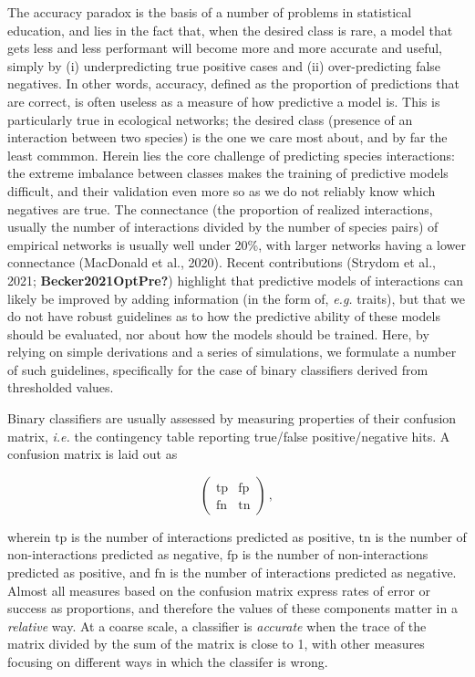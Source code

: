 \documentclass[11pt]{article}
\begin{document}
\vfill

\clearpage
\linenumbers
\pagestyle{normal}

The accuracy paradox is the basis of a number of problems in statistical
education, and lies in the fact that, when the desired class is rare, a
model that gets less and less performant will become more and more
accurate and useful, simply by (i) underpredicting true positive cases
and (ii) over-predicting false negatives. In other words, accuracy,
defined as the proportion of predictions that are correct, is often
useless as a measure of how predictive a model is. This is particularly
true in ecological networks; the desired class (presence of an
interaction between two species) is the one we care most about, and by
far the least commmon. Herein lies the core challenge of predicting
species interactions: the extreme imbalance between classes makes the
training of predictive models difficult, and their validation even more
so as we do not reliably know which negatives are true. The connectance
(the proportion of realized interactions, usually the number of
interactions divided by the number of species pairs) of empirical
networks is usually well under 20\%, with larger networks having a lower
connectance (MacDonald et al., 2020). Recent contributions (Strydom et
al., 2021; \textbf{Becker2021OptPre?}) highlight that predictive models
of interactions can likely be improved by adding information (in the
form of, \emph{e.g.} traits), but that we do not have robust guidelines
as to how the predictive ability of these models should be evaluated,
nor about how the models should be trained. Here, by relying on simple
derivations and a series of simulations, we formulate a number of such
guidelines, specifically for the case of binary classifiers derived from
thresholded values.

Binary classifiers are usually assessed by measuring properties of their
confusion matrix, \emph{i.e.} the contingency table reporting true/false
positive/negative hits. A confusion matrix is laid out as

\[\begin{pmatrix}
    \text{tp} & \text{fp} \\
    \text{fn} & \text{tn}
\end{pmatrix} \,,\]

wherein \(\text{tp}\) is the number of interactions predicted as
positive, \(\text{tn}\) is the number of non-interactions predicted as
negative, \(\text{fp}\) is the number of non-interactions predicted as
positive, and \(\text{fn}\) is the number of interactions predicted as
negative. Almost all measures based on the confusion matrix express
rates of error or success as proportions, and therefore the values of
these components matter in a \emph{relative} way. At a coarse scale, a
classifier is \emph{accurate} when the trace of the matrix divided by
the sum of the matrix is close to 1, with other measures focusing on
different ways in which the classifer is wrong.
\end{document}
